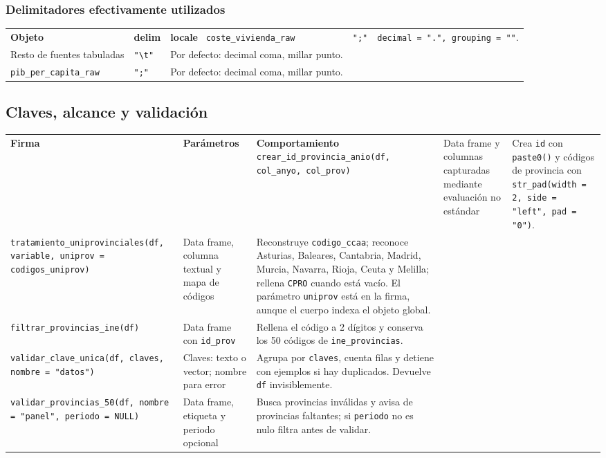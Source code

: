\documentclass[10pt,a4paper]{article}
\newcommand{\code}[1]{\texttt{\small #1}}
\begin{document}
\subsubsection{Delimitadores efectivamente utilizados}
\begin{tabularx}{\textwidth}{p{}p{}Y}\toprule\textbf{Objeto} & \textbf{delim} & \textbf{locale}\
\midrule
\code{coste\_vivienda\_raw} & \code{";"} & \code{decimal = ".", grouping = ""}.\\
Resto de fuentes tabuladas & \code{"\textbackslash t"} & Por defecto: decimal coma, millar punto.\\
\code{pib\_per\_capita\_raw} & \code{";"} & Por defecto: decimal coma, millar punto.\\
\bottomrule\end{tabularx}

\subsection{Claves, alcance y validación}
\begin{longtable}{p{}p{}p{}}
\toprule\textbf{Firma} & \textbf{Parámetros} & \textbf{Comportamiento}\
\midrule\endhead
\code{crear\_id\_provincia\_anio(df, col\_anyo, col\_prov)} & Data frame y columnas capturadas mediante evaluación no estándar & Crea \code{id} con \code{paste0()} y códigos de provincia con \code{str\_pad(width = 2, side = "left", pad = "0")}.\\
\code{tratamiento\_uniprovinciales(df, variable, uniprov = codigos\_uniprov)} & Data frame, columna textual y mapa de códigos & Reconstruye \code{codigo\_ccaa}; reconoce Asturias, Baleares, Cantabria, Madrid, Murcia, Navarra, Rioja, Ceuta y Melilla; rellena \code{CPRO} cuando está vacío. El parámetro \code{uniprov} está en la firma, aunque el cuerpo indexa el objeto global.\\
\code{filtrar\_provincias\_ine(df)} & Data frame con \code{id\_prov} & Rellena el código a 2 dígitos y conserva los 50 códigos de \code{ine\_provincias}.\\
\code{validar\_clave\_unica(df, claves, nombre = "datos")} & Claves: texto o vector; nombre para error & Agrupa por \code{claves}, cuenta filas y detiene con ejemplos si hay duplicados. Devuelve \code{df} invisiblemente.\\
\code{validar\_provincias\_50(df, nombre = "panel", periodo = NULL)} & Data frame, etiqueta y periodo opcional & Busca provincias inválidas y avisa de provincias faltantes; si \code{periodo} no es nulo filtra antes de validar.\\
\bottomrule\end{longtable}
\end{document}
